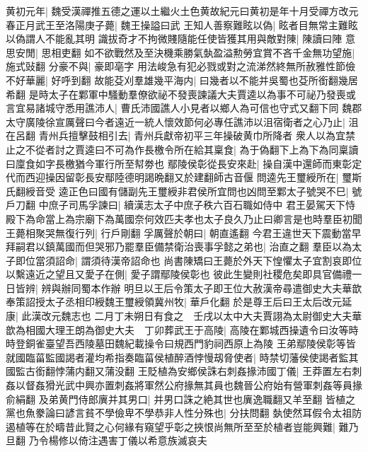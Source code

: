 黄初元年|{
	魏受漢禪推五德之運以土繼火土色黄故紀元曰黄初是年十月受禪方改元}
春正月武王至洛陽庚子薨|{
	魏王操謚曰武}
王知人善察難眩以偽|{
	眩者目無常主難眩以偽謂人不能亂其明}
識拔奇才不拘微賤隨能任使皆獲其用與敵對陳|{
	陳讀曰陣}
意思安閒|{
	思相吏翻}
如不欲戰然及至決機乘勝氣埶盈溢勲勞宜賞不吝千金無功望施|{
	施式䜴翻}
分豪不與|{
	豪即亳字}
用法峻急有犯必戮或對之流涕然終無所赦雅性節儉不好華麗|{
	好呼到翻}
故能芟刈羣雄幾平海内|{
	曰幾者以不能并吳蜀也芟所銜翻幾居希翻}
是時太子在鄴軍中騷動羣僚欲祕不發喪諫議大夫賈逵以為事不可祕乃發喪或言宜易諸城守悉用譙沛人|{
	曹氏沛國譙人小見者以鄉人為可信也守式又翻下同}
魏郡太守廣陵徐宣厲聲曰今者遠近一統人懷效節何必專任譙沛以沮宿衛者之心乃止|{
	沮在呂翻}
青州兵擅擊鼓相引去|{
	青州兵獻帝初平三年操破黄巾所降者}
衆人以為宜禁止之不從者討之賈逵曰不可為作長檄令所在給其稟食|{
	為于偽翻下上為下為同稟讀曰廩食如字長檄猶今軍行所至幇劵也}
鄢陵侯彰從長安來赴|{
	操自漢中還師而東彰定代而西迎操因留彰長安鄢陸德明謁晩翻又於建翻師古音偃}
問逵先王璽綬所在|{
	璽斯氏翻綬音受}
逵正色曰國有儲副先王璽綬非君侯所宜問也凶問至鄴太子號哭不巳|{
	號戶刀翻}
中庶子司馬孚諫曰|{
	續漢志太子中庶子秩六百石職如侍中}
君王晏駕天下恃殿下為命當上為宗廟下為萬國奈何效匹夫孝也太子良久乃止曰卿言是也時羣臣初聞王薨相聚哭無復行列|{
	行戶剛翻}
孚厲聲於朝曰|{
	朝直遙翻}
今君王違世天下震動當早拜嗣君以鎮萬國而但哭邪乃罷羣臣備禁衛治喪事孚懿之弟也|{
	治直之翻}
羣臣以為太子即位當須詔命|{
	謂須待漢帝詔命也}
尚書陳矯曰王薨於外天下惶懼太子宜割哀即位以繫遠近之望且又愛子在側|{
	愛子謂鄢陵侯彰也}
彼此生變則社稷危矣即具官備禮一日皆辨|{
	辨與辦同蜀本作辦}
明旦以王后令策太子即王位大赦漢帝尋遣御史大夫華歆奉策詔授太子丞相印綬魏王璽綬領冀州牧|{
	華戶化翻}
於是尊王后曰王太后改元延康|{
	此漢改元魏志也}
二月丁未朔日有食之　壬戌以太中大夫賈詡為太尉御史大夫華歆為相國大理王朗為御史大夫　丁卯葬武王于高陵|{
	高陵在鄴城西操遺令曰汝等時時登銅雀臺望吾西陵墓田魏紀載操令曰規西門豹祠西原上為陵}
王弟鄢陵侯彰等皆就國臨菑監國謁者灌均希指奏臨菑侯植醉酒悖慢刼脅使者|{
	時禁切藩侯使謁者監其國監古銜翻悖蒲内翻又蒲没翻}
王貶植為安鄉侯誅右刺姦掾沛國丁儀|{
	王莽置左右刺姦以督姦猾光武中興亦置刺姦將軍然公府掾無其員也魏晉公府始有營軍刺姦等員掾俞絹翻}
及弟黄門侍郎廙并其男口|{
	并男口誅之絶其世也廙逸職翻又羊至翻}
皆植之黨也魚豢論曰諺言貧不學儉卑不學恭非人性分殊也|{
	分扶問翻}
埶使然耳假令太祖防遏植等在於疇昔此賢之心何緣有窺望乎彰之挾恨尚無所至至於植者豈能興難|{
	難乃旦翻}
乃令楊修以倚注遇害丁儀以希意族滅哀夫

